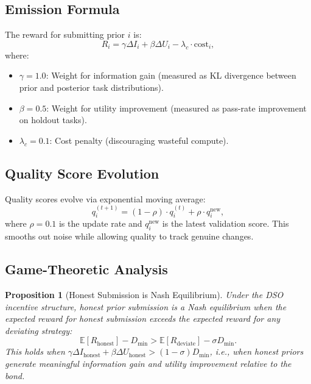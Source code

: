 \documentclass[11pt]{article}
\newtheorem{proposition}[theorem]{Proposition}
\begin{document}
\subsection{Emission Formula}

The reward for submitting prior $i$ is:
\begin{equation}
    R_i = \gamma \Delta I_i + \beta \Delta U_i - \lambda_c \cdot \text{cost}_i,
    \label{eq:emission}
\end{equation}
where:
\begin{itemize}[leftmargin=1.5em]
    \item $\gamma = 1.0$: Weight for information gain (measured as KL divergence
          between prior and posterior task distributions).
    \item $\beta = 0.5$: Weight for utility improvement (measured as
          pass-rate improvement on holdout tasks).
    \item $\lambda_c = 0.1$: Cost penalty (discouraging wasteful compute).
\end{itemize}

\subsection{Quality Score Evolution}

Quality scores evolve via exponential moving average:
\begin{equation}
    q_i^{(t+1)} = (1 - \rho) \cdot q_i^{(t)} + \rho \cdot q_i^{\text{new}},
\end{equation}
where $\rho = 0.1$ is the update rate and $q_i^{\text{new}}$ is the latest
validation score. This smooths out noise while allowing quality to track genuine
changes.

\subsection{Game-Theoretic Analysis}

\begin{proposition}[Honest Submission is Nash Equilibrium]
Under the DSO incentive structure, honest prior submission is a Nash equilibrium
when the expected reward for honest submission exceeds the expected reward for
any deviating strategy:
\begin{equation}
    \mathbb{E}[R_{\text{honest}}] - D_{\min} > \mathbb{E}[R_{\text{deviate}}] - \sigma D_{\min}.
\end{equation}
This holds when $\gamma \Delta I_{\text{honest}} + \beta \Delta U_{\text{honest}} > (1 - \sigma) D_{\min}$,
i.e., when honest priors generate meaningful information gain and utility
improvement relative to the bond.
\end{proposition}
\end{document}
